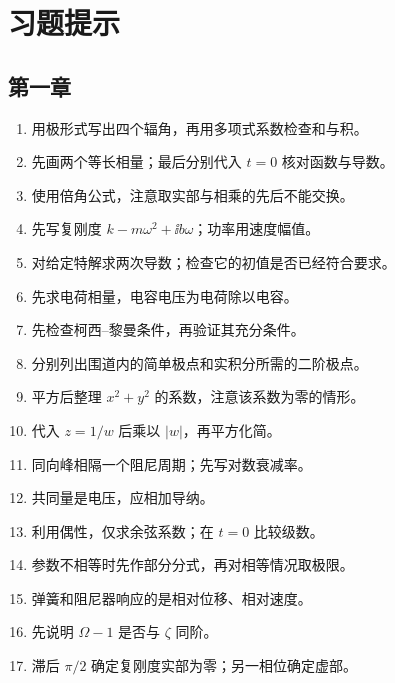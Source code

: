 \documentclass[11pt,openany,fontset=fandol]{ctexbook}
\theoremstyle{plain}\newtheorem{theorem}{定理}[chapter]\newtheorem{proposition}[theorem]{命题}
\theoremstyle{definition}\newtheorem{definition}{定义}[chapter]\newtheorem{example}{例}[chapter]
\theoremstyle{remark}\newtheorem*{remark}{说明}
\begin{document}
\appendix
\begingroup\small{}
\chapter{习题提示}
\section{第一章}
\begin{enumerate}[label=1.\arabic*]
\item 用极形式写出四个辐角，再用多项式系数检查和与积。
\item 先画两个等长相量；最后分别代入 $t=0$ 核对函数与导数。
\item 使用倍角公式，注意取实部与相乘的先后不能交换。
\item 先写复刚度 $k-m\omega^2+\ii b\omega$；功率用速度幅值。
\item 对给定特解求两次导数；检查它的初值是否已经符合要求。
\item 先求电荷相量，电容电压为电荷除以电容。
\item 先检查柯西--黎曼条件，再验证其充分条件。
\item 分别列出围道内的简单极点和实积分所需的二阶极点。
\item 平方后整理 $x^2+y^2$ 的系数，注意该系数为零的情形。
\item 代入 $z=1/w$ 后乘以 $|w|$，再平方化简。
\item 同向峰相隔一个阻尼周期；先写对数衰减率。
\item 共同量是电压，应相加导纳。
\item 利用偶性，仅求余弦系数；在 $t=0$ 比较级数。
\item 参数不相等时先作部分分式，再对相等情况取极限。
\item 弹簧和阻尼器响应的是相对位移、相对速度。
\item 先说明 $\Omega-1$ 是否与 $\zeta$ 同阶。
\item 滞后 $\pi/2$ 确定复刚度实部为零；另一相位确定虚部。
\end{enumerate}
\end{document}
